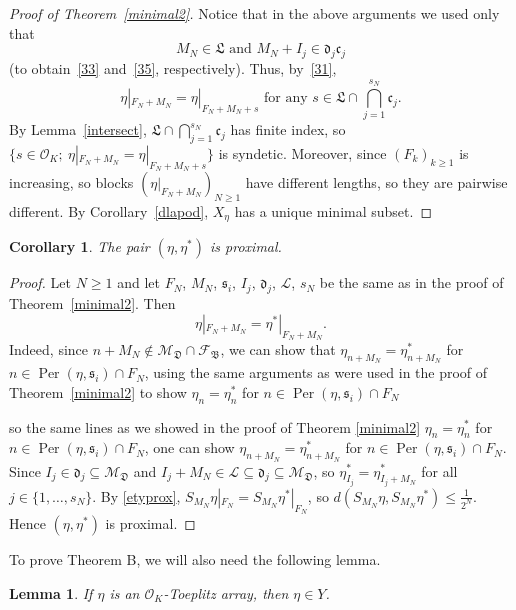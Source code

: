 \documentclass[leqno,a4paper,12pt]{article}
\newtheorem{Lemma}[Th]{Lemma}
\newtheorem{Cor}[Th]{Corollary}
\theoremstyle{definition}
\newcommand{\Per}{\operatorname{Per}\nolimits}
\newcommand{\OK}{\mathcal{O}_K}
\begin{document}
\begin{proof}[Proof of Theorem~\ref{minimal2}]
Notice that in the above arguments we used only that
\[
M_N\in \mathfrak{L} \text{ and }M_N+I_j\in\mathfrak{d}_j\mathfrak{c}_j
\]
(to obtain~\eqref{33} and~\eqref{35}, respectively). Thus, by~\eqref{31},
\[
\eta|_{F_N+M_N}=\eta|_{F_N+M_N+s}\text{ for any } s\in\mathfrak{L}\cap\bigcap_{j=1}^{s_N}\mathfrak{c}_j.
\]
By Lemma~\ref{intersect}, $\mathfrak{L}\cap\bigcap_{j=1}^{s_N}\mathfrak{c}_j$ has finite index, so $\{s\in\OK;\ \eta|_{F_N+M_N}=\eta|_{F_N+M_N+s}\}$ is syndetic. Moreover, since $(F_k)_{k\geq1}$ is increasing, so blocks $(\eta|_{F_N+M_N})_{N\geq1}$ have different lengths, so they are pairwise different.  By Corollary~\ref{dlapod}, $X_\eta$ has a unique minimal subset.
\end{proof}
\begin{Cor}\label{proxety}
The pair $(\eta,\eta^*)$ is proximal.
\end{Cor}
\begin{proof}
Let $N\geq1$ and let $F_N$, $M_N$, $\mathfrak{s}_i$, $I_j$, $\mathfrak{d}_j$, $\mathcal{L}$, $s_N$ be the same as in the proof of Theorem~\ref{minimal2}.
Then
\begin{equation}\label{etyprox}
\eta|_{F_N+M_N}=\eta^*|_{F_N+M_N}.
\end{equation}
Indeed, since $n+M_N\not\in \mathcal{M}_\mathfrak{D}\cap\mathcal{F}_\mathfrak{B}$, we can show that $\eta_{n+M_N}=\eta^*_{n+M_N}$ for $n\in\Per(\eta,\mathfrak{s}_i)\cap F_N$, using the same arguments as were used in the proof of Theorem~\ref{minimal2} to show $\eta_n=\eta^*_n$ for $n\in\Per(\eta,\mathfrak{s}_i)\cap F_N$


so the same lines as we showed in the proof of Theorem \ref{minimal2} $\eta_n=\eta^*_n$ for $n\in\Per(\eta,\mathfrak{s}_i)\cap F_N$, one can show $\eta_{n+M_N}=\eta^*_{n+M_N}$ for $n\in\Per(\eta,\mathfrak{s}_i)\cap F_N$. Since $I_j\in\mathfrak{d}_j\subseteq\mathcal{M}_\mathfrak{D}$ and $I_j+M_N\in\mathcal{L}\subseteq\mathfrak{d}_j\subseteq\mathcal{M}_\mathfrak{D}$, so $\eta^*_{I_j}=\eta^*_{I_j+M_N}$ for all $j\in\{1,\ldots,s_N\}$. By \eqref{etyprox}, $S_{M_N}\eta|_{F_N}=S_{M_N}\eta^*|_{F_N}$, so $d(S_{M_N}\eta,S_{M_N}\eta^*)\leq\frac{1}{2^N}$. Hence $(\eta,\eta^*)$ is proximal.
\end{proof}
To prove Theorem B, we will also need the following lemma.
\begin{Lemma}\label{Toeplitz_SK}
If $\eta$ is an $\OK$-Toeplitz array, then $\eta\in Y$.
\end{Lemma}
\end{document}

